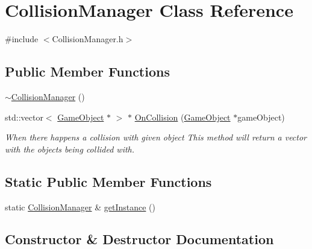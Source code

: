 \hypertarget{class_collision_manager}{}\section{Collision\+Manager Class Reference}
\label{class_collision_manager}


{\ttfamily \#include $<$Collision\+Manager.\+h$>$}

\subsection*{Public Member Functions}
\begin{DoxyCompactItemize}
\item 
\mbox{\hyperlink{class_collision_manager_acdbb3c842f0ef1c7a028d3f080855766}{$\sim$\+Collision\+Manager}} ()
\item 
std\+::vector$<$ \mbox{\hyperlink{class_game_object}{Game\+Object}} $\ast$ $>$ $\ast$ \mbox{\hyperlink{class_collision_manager_aa36e8b56d10fc36677a8a9bb76891c58}{On\+Collision}} (\mbox{\hyperlink{class_game_object}{Game\+Object}} $\ast$game\+Object)
\begin{DoxyCompactList}\small\item\em When there happens a collision with given object This method will return a vector with the objects being collided with. \end{DoxyCompactList}\end{DoxyCompactItemize}
\subsection*{Static Public Member Functions}
\begin{DoxyCompactItemize}
\item 
static \mbox{\hyperlink{class_collision_manager}{Collision\+Manager}} \& \mbox{\hyperlink{class_collision_manager_af7ae5c9cd14ffea044059e17225d3d1c}{get\+Instance}} ()
\end{DoxyCompactItemize}


\subsection{Constructor \& Destructor Documentation}
\mbox{\label{class_collision_manager_acdbb3c842f0ef1c7a028d3f080855766}} 
